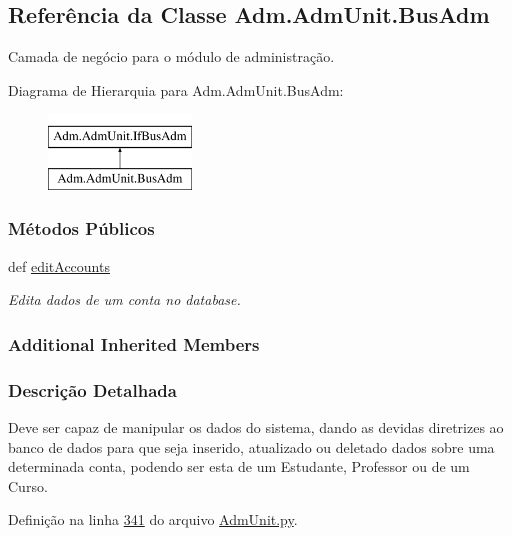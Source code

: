 \hypertarget{classAdm_1_1AdmUnit_1_1BusAdm}{\subsection{Referência da Classe Adm.\-Adm\-Unit.\-Bus\-Adm}
\label{classAdm_1_1AdmUnit_1_1BusAdm}
}


Camada de negócio para o módulo de administração.  


Diagrama de Hierarquia para Adm.\-Adm\-Unit.\-Bus\-Adm\-:\begin{figure}[H]
\begin{center}
\leavevmode
\includegraphics[height=2.000000cm]{de/de0/classAdm_1_1AdmUnit_1_1BusAdm}
\end{center}
\end{figure}
\subsubsection*{Métodos Públicos}
\begin{DoxyCompactItemize}
\item 
def \hyperlink{classAdm_1_1AdmUnit_1_1BusAdm_a0650e636805d049ce37fae5b0ac132e0}{edit\-Accounts}
\begin{DoxyCompactList}\small\item\em Edita dados de um conta no database. \end{DoxyCompactList}\end{DoxyCompactItemize}
\subsubsection*{Additional Inherited Members}


\subsubsection{Descrição Detalhada}
Deve ser capaz de manipular os dados do sistema, dando as devidas diretrizes ao banco de dados para que seja inserido, atualizado ou deletado dados sobre uma determinada conta, podendo ser esta de um Estudante, Professor ou de um Curso. 

Definição na linha \hyperlink{AdmUnit_8py_source_l00341}{341} do arquivo \hyperlink{AdmUnit_8py_source}{Adm\-Unit.\-py}.



